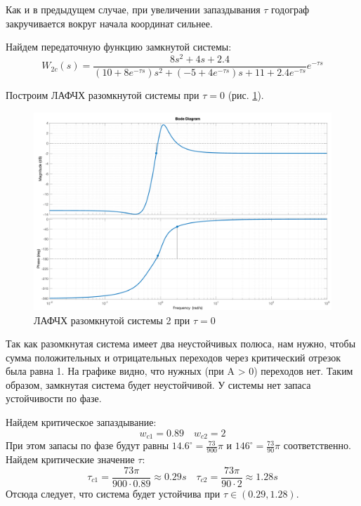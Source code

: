 Как и в предыдущем случае, при увеличении запаздывания $\tau$ годограф закручивается вокруг начала координат сильнее.

Найдем передаточную функцию замкнутой системы:
\begin{equation}
    W_{2c}(s) = \frac{8s^2 + 4s + 2.4}{(10 + 8 e^{-\tau s})s^2 + (-5 + 4e^{-\tau s})s + 11 + 2.4e^{-\tau s}}e^{-\tau s}
\end{equation}

Построим ЛАФЧХ разомкнутой системы при $\tau = 0$ (рис. \ref{fig:task7_bode_open_1}).
\begin{figure}[ht!]
    \centering
    \includegraphics[width=\textwidth]{media/plots/task7_bode_open_1.png}
    \caption{ЛАФЧХ разомкнутой системы 2 при $\tau = 0$}
    \label{fig:task7_bode_open_1}
\end{figure}

Так как разомкнутая система имеет два неустойчивых полюса, нам нужно, чтобы сумма 
положительных и отрицательных переходов через критический отрезок была равна 1.
На графике видно, что нужных (при A > 0) переходов нет. Таким образом, замкнутая система будет неустойчивой.
У системы нет запаса устойчивости по фазе. 

Найдем критическое запаздывание: 
\begin{equation}
    w_{c1} = 0.89 \quad w_{c2} = 2
\end{equation}
При этом запасы по фазе будут равны $14.6^\circ = \frac{73}{900}\pi$ и $146^\circ = \frac{73}{90}\pi$ соответственно.
Найдем критические значение $\tau$: 
\begin{equation}
    \tau_{c1} = \frac{73\pi}{900 \cdot 0.89} \approx 0.29s \quad \tau_{c2} = \frac{73\pi}{90 \cdot 2} \approx 1.28s
\end{equation}
Отсюда следует, что система будет устойчива при $\tau \in (0.29, 1.28)$.

